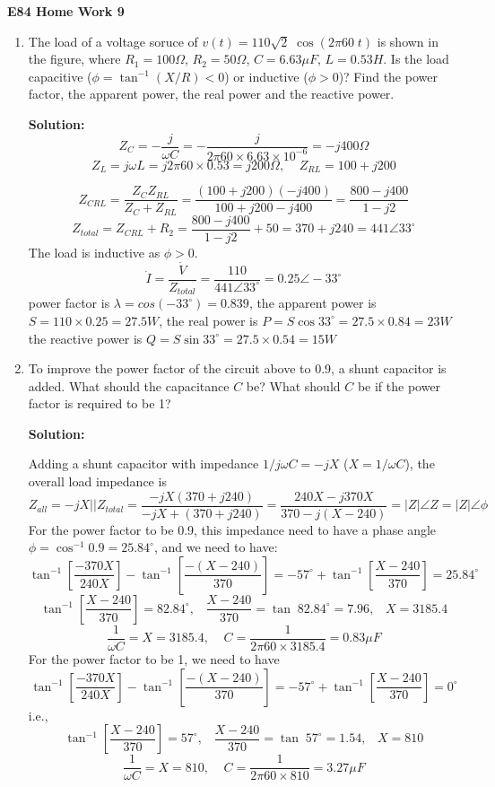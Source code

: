 \usepackage{html}

\begin{center}
{\Large \bf E84 Home Work 9}
\end{center}
\begin{enumerate}

\item The load of a voltage soruce of $v(t)=110\sqrt{2} \;\cos(2\pi 60\;t)$
is shown in the figure, where $R_1=100\Omega$, $R_2=50\Omega$, $C=6.63\mu F$, 
$L=0.53 H$. Is the load capacitive ($\phi=\tan^{-1}(X/R)<0$) or inductive 
($\phi>0$)? Find the power factor, the apparent power, the real power and 
the reactive power. 


  {\bf Solution:}
 \[ Z_C=-\frac{j}{\omega C}=-\frac{j}{2\pi 60\times 6.63\times 10^{-6}}
  	=-j400\Omega\]
  \[Z_L=j\omega L=j 2\pi 60\times 0.53=j200\Omega,\;\;\;\; Z_{RL}=100+j200\]
  
  \[ Z_{CRL}=\frac{Z_C Z_{RL}}{Z_C+Z_{RL}}=\frac{(100+j200)(-j400)}{100+j200-j400}
  	=\frac{800-j400}{1-j2}	\]
  \[
  Z_{total}=Z_{CRL}+R_2=\frac{800-j400}{1-j2}+50=370+j240=441\angle 33^\circ
  \]
  The load is inductive as $\phi>0$.
  \[ \dot{I}=\frac{\dot{V}}{Z_{total}}=\frac{110}{441\angle 33^\circ}
  	=0.25\angle -33^\circ	\]
  power factor is $\lambda=cos (-33^\circ)=0.839$, 
  the apparent power is $S=110\times 0.25=27.5 W$, 
  the real power is $P=S \cos 33^\circ=27.5\times 0.84=23 W$
  the reactive power is $Q=S \sin 33^\circ=27.5\times 0.54=15 W$


\item To improve the power factor of the circuit above to 0.9, a shunt 
capacitor is added. What should the capacitance $C$ be? What should $C$ be 
if the power factor is required to be 1?


  {\bf Solution:}
 
  Adding a shunt capacitor with impedance $1/j\omega C=-jX$ ($X=1/\omega C$), 
  the overall load impedance is
  \[	Z_{all}=-jX || Z_{total}=\frac{-jX(370+j240)}{-jX+(370+j240)}
  	=\frac{240X-j370X}{370-j(X-240)}=|Z|\angle Z=|Z|\angle \phi	\]
  For the power factor to be 0.9, this impedance need to have a phase angle 
  $\phi=\cos^{-1} 0.9=25.84^\circ$, and we need to have:
  \[	\tan^{-1}[\frac{-370X}{240X}]-\tan^{-1}[\frac{-(X-240)}{370}]=
  	-57^\circ+\tan^{-1}[\frac{X-240}{370}]=25.84^\circ \]
  \[	\tan^{-1}[\frac{X-240}{370}]=82.84^\circ, \;\;\;
  \frac{X-240}{370}=\tan \;82.84^\circ=7.96, \;\;\; X=3185.4 \]
  \[ \frac{1}{\omega C}=X=3185.4,\;\;\;\;C=\frac{1}{2\pi 60\times 3185.4}
  =0.83 \mu F \]
  For the power factor to be 1, we need to have
  \[	\tan^{-1}[\frac{-370X}{240X}]-\tan^{-1}[\frac{-(X-240)}{370}]=
  	-57^\circ+\tan^{-1}[\frac{X-240}{370}]=0^\circ \]
  i.e., 
  \[	\tan^{-1}[\frac{X-240}{370}]=57^\circ, \;\;\;
  \frac{X-240}{370}=\tan \;57^\circ=1.54, \;\;\; X=810 \]
  \[ \frac{1}{\omega C}=X=810,\;\;\;\;C=\frac{1}{2\pi 60\times 810}
  =3.27 \mu F \]


\end{enumerate}
